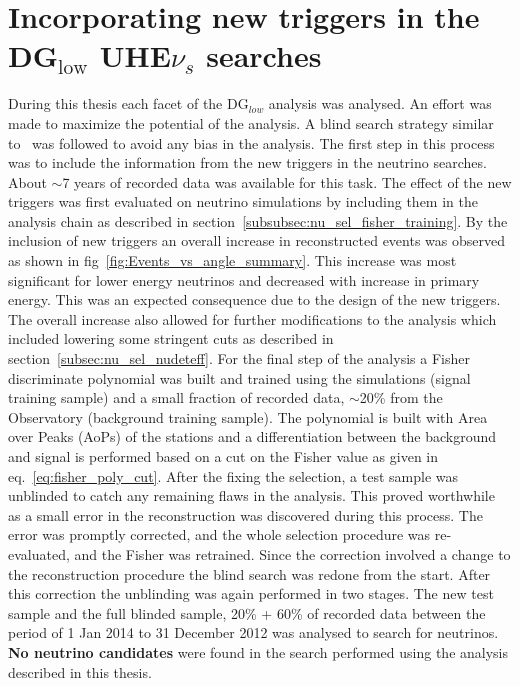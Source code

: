 \section*{Incorporating new triggers in the DG$\mathrm{_{low}}$ UHE$\nu_s$ searches}
During this thesis each facet of the DG$_{low}$ analysis was analysed. An effort was made to maximize the potential of the analysis. A blind search strategy similar to~\cite{gap_note_2013,Aab_2019_diffuse} was followed to avoid any bias in the analysis. The first step in this process was to include the information from the new triggers in the neutrino searches. About $\sim$7 years of recorded data was available for this task. The effect of the new triggers was first evaluated on neutrino simulations by including them in the analysis chain as described in section~\ref{subsubsec:nu_sel_fisher_training}. By the inclusion of new triggers an overall increase in reconstructed events was observed as shown in fig~\ref{fig:Events_vs_angle_summary}. This increase was most significant for lower energy neutrinos and decreased with increase in primary energy. This was an expected consequence due to the design of the new triggers. The overall increase also allowed for further modifications to the analysis which included lowering some stringent cuts as described in section~\ref{subsec:nu_sel_nudeteff}. For the final step of the analysis a Fisher discriminate polynomial was built and trained using the simulations (signal training sample) and a small fraction of recorded data, $\sim$20\% from the Observatory (background training sample). The polynomial is built with Area over Peaks (AoPs) of the stations and a differentiation between the background and signal is performed based on a cut on the Fisher value as given in eq.~\ref{eq:fisher_poly_cut}.
After the fixing the selection, a test sample was unblinded to catch any remaining flaws in the analysis. This proved worthwhile as a small error in the reconstruction was discovered during this process. The error was promptly corrected, and the whole selection procedure was re-evaluated, and the Fisher was retrained. Since the correction involved a change to the reconstruction procedure the blind search was redone from the start. After this correction the unblinding was again performed in two stages. The new test sample and the full blinded sample, 20\% + 60\% of recorded data between the period of 1 Jan 2014 to 31 December 2012 was analysed to search for neutrinos. \textbf{No neutrino candidates} were found in the search performed using the analysis described in this thesis. 


